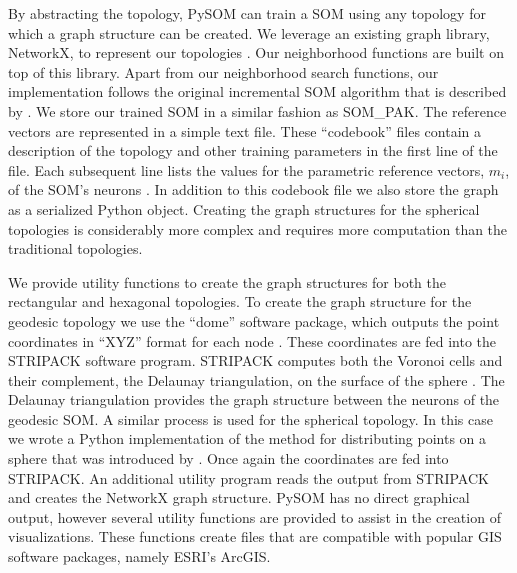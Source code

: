 By abstracting the topology, PySOM can train a SOM using any topology for
which a graph structure can be created. We leverage an existing graph library,
NetworkX, to represent our topologies \citep{networkx}.  Our neighborhood
functions are built on top of this library.  Apart from our neighborhood
search functions, our implementation follows the original incremental SOM
algorithm that is described by \cite{Kohonen2000}.  We store our trained SOM
in a similar fashion as SOM\_PAK.  The reference vectors are represented in a
simple text file.  These ``codebook'' files contain a description of the
topology and other training parameters in the first line of the file.  Each
subsequent line lists the values for the parametric reference vectors, $m_i$,
of the SOM's neurons \citep{kohonen1996}. In addition to this codebook file we
also store the graph as a serialized Python object.  Creating the graph
structures for the spherical topologies is considerably more complex and
requires more computation than the traditional topologies.

We provide utility functions to create the graph structures for both the
rectangular and hexagonal topologies.  To create the graph structure for the
geodesic topology we use the ``dome'' software package, which outputs the
point coordinates in ``XYZ'' format for each node \citep{dome}.  These
coordinates are fed into the STRIPACK software program. STRIPACK computes both
the Voronoi cells and their complement, the Delaunay triangulation, on the
surface of the sphere \citep{Ranka97}.  The Delaunay triangulation provides the graph
structure between the neurons of the geodesic SOM.  A similar process is used
for the spherical topology. In this case we wrote a Python implementation of
the method for distributing points on a sphere that was introduced by
\cite{Rakhmanov94}.  Once again the coordinates are fed into STRIPACK.
An additional utility program reads the output from STRIPACK and
creates the NetworkX graph structure.  PySOM has no direct graphical
output, however several utility functions are provided to assist in the
creation of visualizations.  These functions create files that are compatible with
popular GIS software packages, namely ESRI's ArcGIS.

